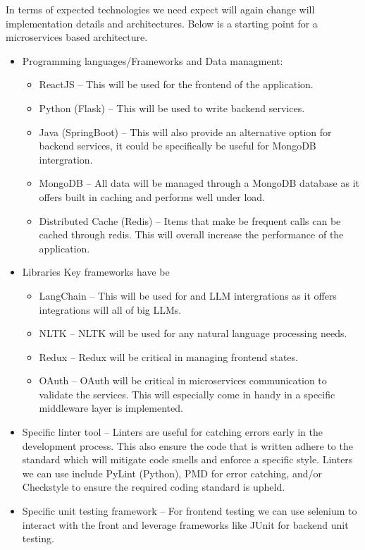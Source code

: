\documentclass{article}
\begin{document}


In terms of expected technologies we need expect will again change will implementation details and architectures. Below is a starting point for a microservices based architecture.


\begin{itemize}
  \item Programming languages/Frameworks and Data managment:
    \begin{itemize}
      \item ReactJS -- This will be used for the frontend of the application.
      \item Python (Flask) -- This will be used to write backend services.
      \item Java (SpringBoot) -- This will also provide an alternative option for backend services, it could be specifically be useful for MongoDB intergration.
      \item MongoDB -- All data will be managed through a MongoDB database as it offers built in caching and performs well under load.
      \item Distributed Cache (Redis) -- Items that make be frequent calls can be cached through redis. This will overall increase the performance of the application.
    \end{itemize}
    

  \item Libraries
    Key frameworks have be
    \begin{itemize}
      \item LangChain -- This will be used for and LLM intergrations as it offers integrations will all of big LLMs.
      \item NLTK -- NLTK will be used for any natural language processing needs. 
      \item Redux -- Redux will be critical in managing frontend states.
      \item OAuth -- OAuth will be critical in microservices communication to validate the services. This will especially come in handy in a specific middleware layer is implemented.
    \end{itemize}

  \item Specific linter tool -- Linters are useful for catching errors early in the development process. This also ensure the code that is written adhere to the standard which will mitigate code smells and enforce a specific style. Linters we can use include PyLint (Python), PMD for error catching, and/or Checkstyle to ensure the required coding standard is upheld.
  \item Specific unit testing framework -- For frontend testing we can use selenium to interact with the front and leverage frameworks like JUnit for backend unit testing. 
    

\end{itemize}
\end{document}
